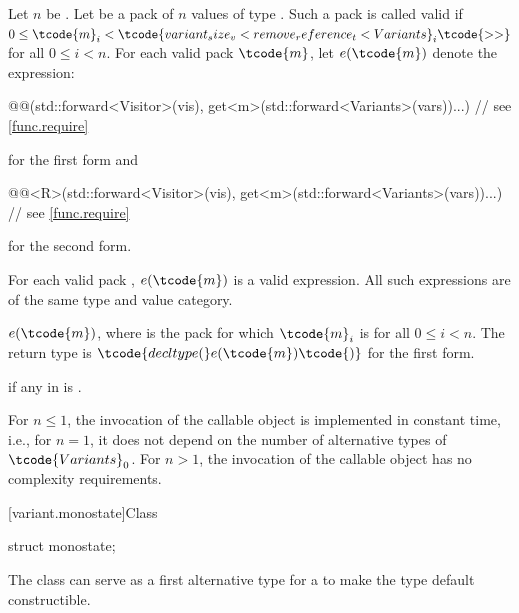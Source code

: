 \begin{itemdescr}
\pnum
Let $n$ be . Let  be a pack of $n$
values of type . Such a pack is called valid if $0 \leq
\tcode{m}_i < \tcode{variant_size_v<remove_reference_t<Variants}_i\tcode{>>}$ for
all $0 \leq i < n$. For each valid pack $\tcode{m}$, let $e(\tcode{m})$
denote the expression:
\begin{codeblock}
@@(std::forward<Visitor>(vis), get<m>(std::forward<Variants>(vars))...) // see \ref{func.require}
\end{codeblock}
for the first form and
\begin{codeblock}
@@<R>(std::forward<Visitor>(vis), get<m>(std::forward<Variants>(vars))...) // see \ref{func.require}
\end{codeblock}
for the second form.

\pnum
\mandates
For each valid pack , $e(\tcode{m})$ is a valid expression.
All such expressions are of the same type and value category.

\pnum
\returns
$e(\tcode{m})$, where  is the pack for which
$\tcode{m}_i$ is  for all $0 \leq i < n$.
The return type is $\tcode{decltype(}e(\tcode{m})\tcode{)}$
for the first form.

\pnum
\throws
{} if any  in  is .

\pnum
\complexity
For $n \leq 1$, the invocation of the callable object is
implemented in constant time, i.e., for $n = 1$, it does not depend on
the number of alternative types of $\tcode{Variants}_0$.
For $n > 1$, the invocation of the callable object has
no complexity requirements.
\end{itemdescr}

%
[variant.monostate]{Class }

\begin{indexed}{}
\begin{itemdecl}
struct monostate{};
\end{itemdecl}
\end{indexed}

\begin{itemdescr}
\pnum
The class  can serve as a first alternative type for
a  to make the  type default constructible.
\end{itemdescr}


